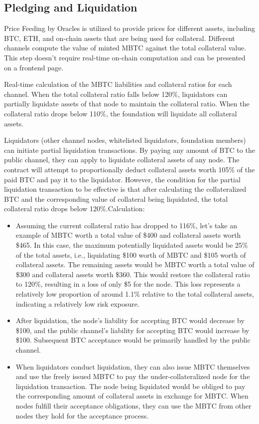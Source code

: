\documentclass{article}
\begin{document}
\subsection{Pledging and Liquidation}
Price Feeding by Oracles is utilized to provide prices for different assets, including BTC, ETH, and on-chain assets that are being used for collateral. Different channels compute the value of minted MBTC against the total collateral value. This step doesn't require real-time on-chain computation and can be presented on a frontend page.
\par Real-time calculation of the MBTC liabilities and collateral ratios for each channel. When the total collateral ratio falls below 120\%, liquidators can partially liquidate assets of that node to maintain the collateral ratio. When the collateral ratio drops below 110\%, the foundation will liquidate all collateral assets.
\par Liquidators (other channel nodes, whitelisted liquidators, foundation members) can initiate partial liquidation transactions. By paying any amount of BTC to the public channel, they can apply to liquidate collateral assets of any node. The contract will attempt to proportionally deduct collateral assets worth 105\% of the paid BTC and pay it to the liquidator. However, the condition for the partial liquidation transaction to be effective is that after calculating the collateralized BTC and the corresponding value of collateral being liquidated, the total collateral ratio drops below 120\%\cite{aavev3}.Calculation:
\begin{itemize}
    \item Assuming the current collateral ratio has dropped to 116\%, let's take an example of MBTC worth a total value of \$400 and collateral assets worth \$465. In this case, the maximum potentially liquidated assets would be 25\% of the total assets, i.e., liquidating \$100 worth of MBTC and \$105 worth of collateral assets. The remaining assets would be MBTC worth a total value of \$300 and collateral assets worth \$360. This would restore the collateral ratio to 120\%, resulting in a loss of only \$5 for the node. This loss represents a relatively low proportion of around 1.1\% relative to the total collateral assets, indicating a relatively low risk exposure.
    \item After liquidation, the node's liability for accepting BTC would decrease by \$100, and the public channel's liability for accepting BTC would increase by \$100. Subsequent BTC acceptance would be primarily handled by the public channel.
    \item When liquidators conduct liquidation, they can also issue MBTC themselves and use the freely issued MBTC to pay the under-collateralized node for the liquidation transaction. The node being liquidated would be obliged to pay the corresponding amount of collateral assets in exchange for MBTC. When nodes fulfill their acceptance obligations, they can use the MBTC from other nodes they hold for the acceptance process.
\end{itemize}
\end{document}
